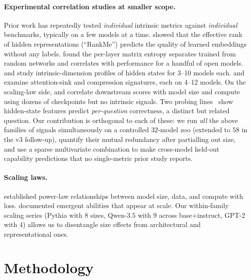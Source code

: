 \documentclass[preprint]{neurips_2025}
\begin{document}
\paragraph{Experimental correlation studies at smaller scope.}
Prior work has repeatedly tested \emph{individual} intrinsic metrics against \emph{individual} benchmarks, typically on a few models at a time. \citet{garrido2023rankme} showed that the effective rank of hidden representations (``RankMe'') predicts the quality of learned embeddings without any labels. \citet{wei2024matrixentropy} found the per-layer matrix entropy separates trained from random networks and correlates with performance for a handful of open models. \citet{cavagnero2025lessismore} and \citet{bonfanti2025geometrytokens} study intrinsic-dimension profiles of hidden states for 3--10 models each. \citet{gu2025attentionsinks} and \citet{pedrotti2025compressionvalley} examine attention-sink and compression signatures, each on 4--12 models. On the scaling-law side, \citet{ruan2025observational} and \citet{isik2024sloth} correlate downstream scores with model size and compute using dozens of checkpoints but no intrinsic signals. Two probing lines~\citep{azaria2023internalstate,kadavath2022calibration} show hidden-state features predict \emph{per-question} correctness, a distinct but related question. Our contribution is orthogonal to each of these: we run \emph{all} the above families of signals simultaneously on a controlled $32$-model zoo (extended to $58$ in the v3 follow-up), quantify their mutual redundancy after partialling out size, and use a sparse multivariate combination to make cross-model held-out capability predictions that no single-metric prior study reports.

\paragraph{Scaling laws.}
\citet{kaplan2020scaling} established power-law relationships between model size, data, and compute with loss.
\citet{wei2022emergent} documented emergent abilities that appear at scale.
Our within-family scaling series (Pythia with 8 sizes, Qwen-$3.5$ with 9 across base+instruct, GPT-2 with 4) allows us to disentangle size effects from architectural and representational ones.

\section{Methodology}
\label{sec:methodology}
\end{document}
